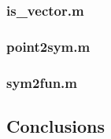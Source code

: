 \documentclass[a4paper,11pt]{article}
\numberwithin{equation}{section} %
\begin{document}
\subsubsection{is\_vector.m}



\subsubsection{point2sym.m}



\subsubsection{sym2fun.m}



% 

\subsection{Conclusions}
\end{document}
